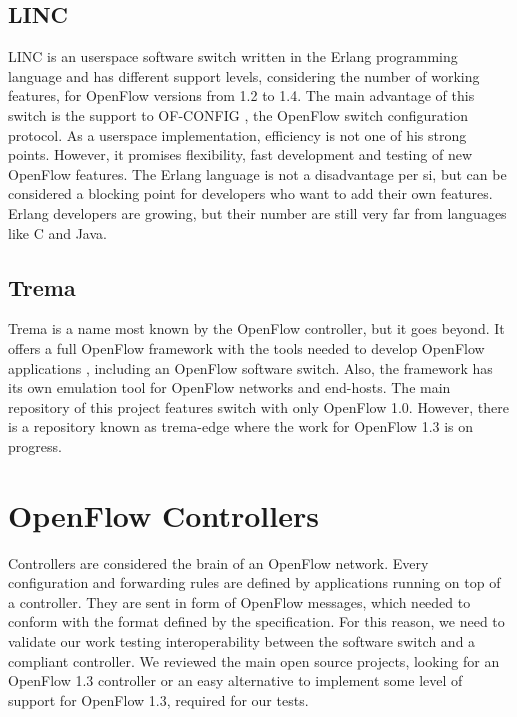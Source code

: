     \subsection{LINC}
    
    LINC \cite{linc} is an userspace software switch written in the Erlang programming language and has different support levels, considering the number of working features, for OpenFlow versions from 1.2 to 1.4. The main advantage of this switch is the support to OF-CONFIG \cite{ofconfig}, the OpenFlow switch configuration protocol. As a userspace implementation, efficiency is not one of his strong points. However, it promises flexibility, fast development and testing of new OpenFlow features. 
    The Erlang language is not a disadvantage per si, but can be considered a blocking point for developers who want to add their own features. Erlang developers are growing, but their number are still very far from languages like C and Java.

    \subsection{Trema}
    
    Trema is a name most known by the OpenFlow controller, but it goes beyond. It offers a full OpenFlow framework with the tools needed to develop OpenFlow applications \cite{trema}, including an OpenFlow software switch. Also, the framework has its own emulation tool for OpenFlow networks and end-hosts. The main repository of this project features switch with only OpenFlow 1.0. However, there is a repository known as trema-edge where the work for OpenFlow 1.3 is on progress.

\section{OpenFlow Controllers}

    Controllers are considered the brain of an OpenFlow network. Every configuration and forwarding rules are defined by applications running on top of a controller. They are sent in form of OpenFlow messages, which needed to conform with the format defined by the specification. For this reason, we need to validate our work testing interoperability between the software switch and a compliant controller. We reviewed the main open source projects, looking for an OpenFlow 1.3 controller or an easy alternative to implement some level of support for OpenFlow 1.3, required for our tests. 

